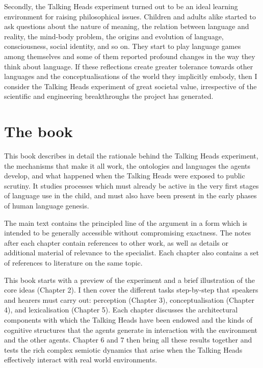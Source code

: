 Secondly, the Talking Heads experiment turned out to be 
an ideal learning environment for raising philosophical
issues. Children and adults alike
started to ask questions about the nature of
meaning, the relation between language
and reality, the mind-body problem, 
the origins and evolution of language, 
consciousness, social identity, and so on. They 
start to play language games among themselves and some of
them reported profound changes in the way they 
think about language. If these reflections create 
greater tolerance towards other languages and 
the conceptualisations of the world
they implicitly embody, then I consider the
Talking Heads experiment of great societal value, irrespective of
the scientific and engineering breakthroughs
the project has generated. 

\section{The book}

This book describes in detail the rationale behind the 
Talking Heads experiment, the mechanisms that make it
all work, the ontologies and 
languages the agents develop, and what happened
when the Talking Heads were exposed to public scrutiny. 
It studies processes which must already be active in the 
very first stages of language use in the child, and 
must also have been present in the early phases of 
human language genesis. 

The main text contains the
principled line of the argument in a form which is intended to be generally
accessible without compromising exactness. The notes after
each chapter contain references to other work, as well 
as details or additional material of relevance to the 
specialist. Each chapter also contains a set of references to
literature on the same topic. 

This book starts with a preview of the 
experiment and a brief illustration of the core ideas (Chapter 2). 
I then cover the 
different tasks step-by-step that speakers and hearers must carry out: 
perception (Chapter 3), conceptualisation (Chapter 4), 
and lexicalisation (Chapter 5). Each 
chapter discusses the 
architectural components with which the Talking Heads 
have been endowed and the kinds of cognitive structures that 
the agents generate in interaction with the environment 
and the other agents. Chapter 6 and 7 then bring all these 
results together and tests the rich complex semiotic dynamics that 
arise when the Talking Heads effectively interact 
with real world environments. 

